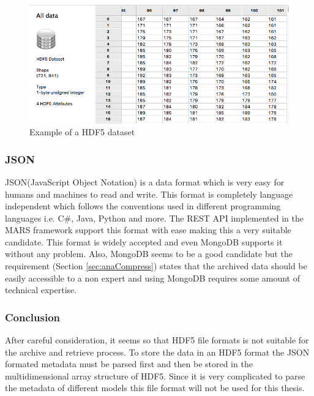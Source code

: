 \begin{figure}[H]
    \centering \includegraphics[scale=0.45]{grafiken/dataset.png}
    \caption{Example of a HDF5 dataset}
    \label{fig:dataset}
\end{figure}

\subsubsection{JSON} 
JSON(JavaScript Object Notation) is a data format which is very easy for humans and machines to read and write. This format is
completely language independent which follows the conventions used in different programming languages i.e. C\#, Java, Python and more. The REST API implemented in the
MARS framework support this format with ease making this a very suitable candidate. This format is widely 
accepted and even MongoDB supports it without any problem. Also, MongoDB seems to be a good candidate but the requirement (Section \ref{sec:anaCompress}) states that the archived
data should be easily accessible to a non expert and using MongoDB requires some amount of technical expertise.


\subsubsection{Conclusion}
   After careful consideration,  
    it seems so that HDF5 file formats is not suitable for the archive and retrieve process.      
    To store the data in an HDF5 format the JSON formated metadata must be parsed first and then
    be stored in the multidimensional array structure of HDF5. Since it is very complicated to parse the metadata of different models this
    file format will not be used for this thesis. 

